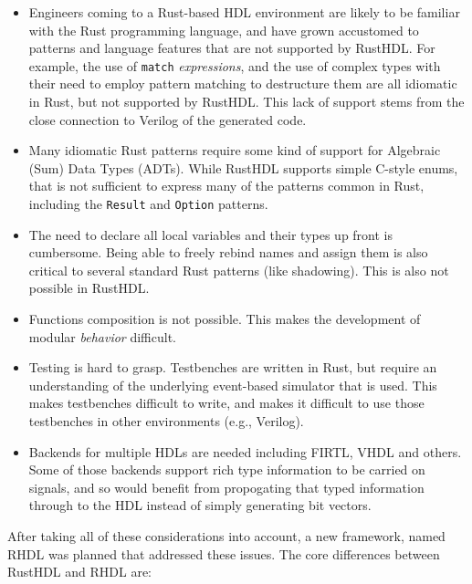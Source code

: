 \documentclass[conference]{IEEEtran}
\begin{document}
\begin{itemize}
  \item Engineers coming to a Rust-based HDL environment are likely to be familiar with the Rust programming language,
  and have grown accustomed to patterns and language features that are not supported by RustHDL.  For example, the 
  use of \verb|match| \emph{expressions}, and the use of complex types with their need to employ pattern matching to destructure 
  them are all idiomatic in Rust, but not supported by RustHDL.  This 
  lack of support stems from the close connection to Verilog of the generated code.
  \item Many idiomatic Rust patterns require some kind of support for Algebraic (Sum) Data Types (ADTs).  While RustHDL
  supports simple C-style enums, that is not sufficient to express many of the patterns common in Rust, including the 
  \verb|Result| and \verb|Option| patterns.
  \item The need to declare all local variables and their types up front is cumbersome.  Being able to freely rebind
  names and assign them is also critical to several standard Rust patterns (like shadowing).  This is also not
  possible in RustHDL.
  \item Functions composition is not possible.  This makes the development of modular \emph{behavior} difficult.
  \item Testing is hard to grasp.  Testbenches are written in Rust, but require an understanding of the underlying
  event-based simulator that is used.  This makes testbenches difficult to write, and makes it difficult to use those
  testbenches in other environments (e.g., Verilog).
  \item Backends for multiple HDLs are needed including FIRTL, VHDL and others.  Some of those backends support
  rich type information to be carried on signals, and so would benefit from propogating that typed information through
  to the HDL instead of simply generating bit vectors.
\end{itemize}

After taking all of these considerations into account, a new framework, named RHDL was planned that addressed these issues.  The 
core differences between RustHDL and RHDL are:
\end{document}
